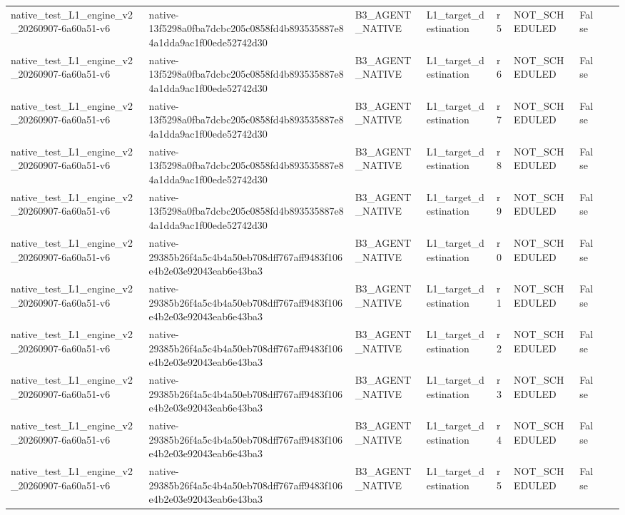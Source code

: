 \begin{tabular}{lllllllll}
native\_test\_L1\_engine\_v2\_20260907-6a60a51-v6 & native-13f5298a0fba7dcbc205c0858fd4b893535887e84a1dda9ac1f00ede52742d30 & B3\_AGENT\_NATIVE & L1\_target\_destination & r5 & NOT\_SCHEDULED & False &  &  \\
native\_test\_L1\_engine\_v2\_20260907-6a60a51-v6 & native-13f5298a0fba7dcbc205c0858fd4b893535887e84a1dda9ac1f00ede52742d30 & B3\_AGENT\_NATIVE & L1\_target\_destination & r6 & NOT\_SCHEDULED & False &  &  \\
native\_test\_L1\_engine\_v2\_20260907-6a60a51-v6 & native-13f5298a0fba7dcbc205c0858fd4b893535887e84a1dda9ac1f00ede52742d30 & B3\_AGENT\_NATIVE & L1\_target\_destination & r7 & NOT\_SCHEDULED & False &  &  \\
native\_test\_L1\_engine\_v2\_20260907-6a60a51-v6 & native-13f5298a0fba7dcbc205c0858fd4b893535887e84a1dda9ac1f00ede52742d30 & B3\_AGENT\_NATIVE & L1\_target\_destination & r8 & NOT\_SCHEDULED & False &  &  \\
native\_test\_L1\_engine\_v2\_20260907-6a60a51-v6 & native-13f5298a0fba7dcbc205c0858fd4b893535887e84a1dda9ac1f00ede52742d30 & B3\_AGENT\_NATIVE & L1\_target\_destination & r9 & NOT\_SCHEDULED & False &  &  \\
native\_test\_L1\_engine\_v2\_20260907-6a60a51-v6 & native-29385b26f4a5c4b4a50eb708dff767aff9483f106e4b2e03e92043eab6e43ba3 & B3\_AGENT\_NATIVE & L1\_target\_destination & r0 & NOT\_SCHEDULED & False &  &  \\
native\_test\_L1\_engine\_v2\_20260907-6a60a51-v6 & native-29385b26f4a5c4b4a50eb708dff767aff9483f106e4b2e03e92043eab6e43ba3 & B3\_AGENT\_NATIVE & L1\_target\_destination & r1 & NOT\_SCHEDULED & False &  &  \\
native\_test\_L1\_engine\_v2\_20260907-6a60a51-v6 & native-29385b26f4a5c4b4a50eb708dff767aff9483f106e4b2e03e92043eab6e43ba3 & B3\_AGENT\_NATIVE & L1\_target\_destination & r2 & NOT\_SCHEDULED & False &  &  \\
native\_test\_L1\_engine\_v2\_20260907-6a60a51-v6 & native-29385b26f4a5c4b4a50eb708dff767aff9483f106e4b2e03e92043eab6e43ba3 & B3\_AGENT\_NATIVE & L1\_target\_destination & r3 & NOT\_SCHEDULED & False &  &  \\
native\_test\_L1\_engine\_v2\_20260907-6a60a51-v6 & native-29385b26f4a5c4b4a50eb708dff767aff9483f106e4b2e03e92043eab6e43ba3 & B3\_AGENT\_NATIVE & L1\_target\_destination & r4 & NOT\_SCHEDULED & False &  &  \\
native\_test\_L1\_engine\_v2\_20260907-6a60a51-v6 & native-29385b26f4a5c4b4a50eb708dff767aff9483f106e4b2e03e92043eab6e43ba3 & B3\_AGENT\_NATIVE & L1\_target\_destination & r5 & NOT\_SCHEDULED & False &  &  \\

\end{tabular}
